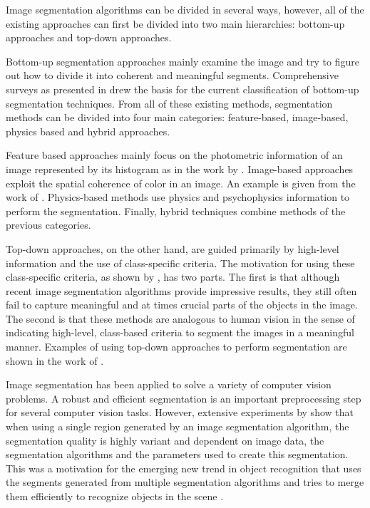 \documentclass[10pt,twocolumn,letterpaper]{article}
\begin{document}
Image segmentation algorithms can be divided in several ways, however,
all of the existing approaches can first be divided into two main
hierarchies: bottom-up approaches and top-down approaches.

Bottom-up segmentation approaches mainly examine the image and try to
figure out how to divide it into coherent and meaningful segments. 
Comprehensive surveys as presented in \cite{Yz_colorimage,Cheng01colorimage}
drew the basis for the current classification of bottom-up segmentation
techniques. From all of these existing methods, segmentation methods can
be divided into four main categories: feature-based, image-based,
physics based and hybrid approaches.

Feature based approaches mainly focus on the photometric information of
an image represented by its histogram as in the work by
\cite{1059188,Yang07unsupervisedsegmentation}. Image-based approaches
exploit the spatial coherence of color in an image. An example is given
from the work of \cite{649319}. Physics-based methods use physics and
psychophysics information to perform the segmentation. Finally, hybrid
techniques combine methods of the previous categories.

Top-down approaches, on the other hand, are guided primarily by high-level
information and the use of class-specific criteria. The motivation for
using these class-specific criteria, as shown by \cite{649285}, has two
parts. The first is that although recent image segmentation algorithms
provide impressive results, they still often fail to capture meaningful
and at times crucial parts of the objects in the image. The second is that
these methods are analogous to human vision in the sense of indicating
high-level, class-based criteria to segment the images in a meaningful
manner. Examples of using top-down approaches to perform segmentation are
shown in the work of \cite{649285,Leibe04combinedobject,1097721}.

Image segmentation has been applied to solve a variety of computer vision problems.
A robust and efficient segmentation is an important preprocessing step for several
computer vision tasks. However, extensive experiments by \cite{Unnikrishnan_2007_5789}
show that when using a single region generated by an image segmentation
algorithm, the segmentation quality is highly variant and dependent on image
data, the segmentation algorithms and the parameters used to create this
segmentation. This was a motivation for the emerging new trend in object
recognition that uses the segments generated from multiple segmentation
algorithms and tries to merge them efficiently to recognize objects in the
scene \cite{Efros_2006_5395,PSH08,malisiewicz-bmvc07}.
\end{document}
